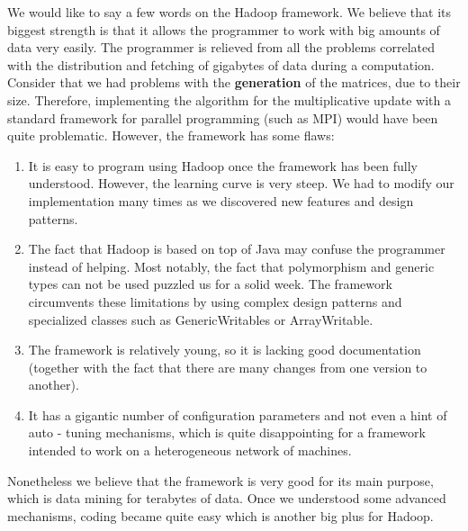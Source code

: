 We would like to say a few words on the Hadoop framework.
We believe that its biggest strength is that it allows the programmer to work with big amounts of data very easily.
The programmer is relieved from all the problems correlated with the distribution and fetching of gigabytes of data during a computation.
Consider that we had problems with the \textbf{generation} of the matrices, due to their size.
Therefore, implementing the algorithm for the multiplicative update with a standard framework for parallel programming (such as MPI) would have been quite problematic.
However, the framework has some flaws:
\begin{enumerate}
\item It is easy to program using Hadoop once the framework has been fully understood. 
However, the learning curve is very steep. 
We had to modify our implementation many times as we discovered new features and design patterns.
\item The fact that Hadoop is based on top of Java may confuse the programmer instead of helping. 
Most notably, the fact that polymorphism and generic types can not be used puzzled us for a solid week.
The framework circumvents these limitations by using complex design patterns and specialized classes such as GenericWritables or ArrayWritable.
\item The framework is relatively young, so it is lacking good documentation (together with the fact that there are many changes from one version to another).
\item It has a gigantic number of configuration parameters and not even a hint of auto - tuning mechanisms, which is quite disappointing for a framework intended to work on a heterogeneous network of machines.
\end{enumerate}

Nonetheless we believe that the framework is very good for its main purpose, which is data mining for terabytes of data.
Once we understood some advanced mechanisms, coding became quite easy which is another big plus for Hadoop.
